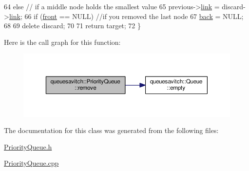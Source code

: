 \begin{DoxyCode}
64       \textcolor{keywordflow}{else} \textcolor{comment}{// if a middle node holds the smallest value                                                    
                                                                                                       }
65          previous->\hyperlink{structqueuesavitch_1_1QueueNode_add6ebeca47fc7ab55c99a33827cb68c4}{link} = discard->\hyperlink{structqueuesavitch_1_1QueueNode_add6ebeca47fc7ab55c99a33827cb68c4}{link};
66       \textcolor{keywordflow}{if} (\hyperlink{classqueuesavitch_1_1Queue_ac30555d398c28ad9b72f9d9b05c1ddf6}{front} == NULL) \textcolor{comment}{//if you removed the last node                                               
                                                                                                            }
67          \hyperlink{classqueuesavitch_1_1Queue_a2759a808c5c9abe7d1c53cc8ade3f5a9}{back} = NULL;
68 
69       \textcolor{keyword}{delete} discard;
70 
71       \textcolor{keywordflow}{return} target;
72    \}
\end{DoxyCode}


Here is the call graph for this function\+:
\nopagebreak
\begin{figure}[H]
\begin{center}
\leavevmode
\includegraphics[width=350pt]{classqueuesavitch_1_1PriorityQueue_aabec9a46c41b0601f05f55a7894d20e1_cgraph}
\end{center}
\end{figure}




The documentation for this class was generated from the following files\+:\begin{DoxyCompactItemize}
\item 
\hyperlink{PriorityQueue_8h}{Priority\+Queue.\+h}\item 
\hyperlink{PriorityQueue_8cpp}{Priority\+Queue.\+cpp}\end{DoxyCompactItemize}
